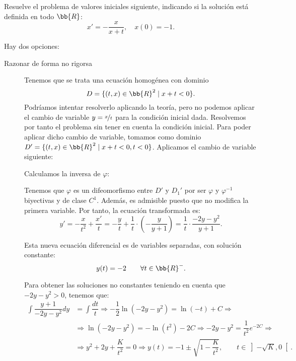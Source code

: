 \documentclass[12pt]{article}
\begin{document}
\begin{ejercicio}
    Resuelve el problema de valores iniciales siguiente, indicando si la solución está definida en todo $\bb{R}$:
    \begin{equation*}
        x'= -\frac{x}{x+t}, \quad x(0)=-1.
    \end{equation*}

    Hay dos opciones:
    \begin{description}
        \item[Razonar de forma no rigorsa]
        
        Tenemos que se trata una ecuación homogénea con dominio $$D=\{(t,x)\in\bb{R}^2\mid x+t<0\}.$$
        Podríamos intentar resolverlo aplicando la teoría, pero no podemos aplicar el cambio de variable $y=\nicefrac{x}{t}$ para la condición inicial dada.
        Resolvemos por tanto el problema sin tener en cuenta la condición inicial. Para poder aplicar dicho cambio de variable, tomamos como dominio
        $D'=\{(t,x)\in\bb{R}^2\mid x+t< 0,t<0\}$. Aplicamos el cambio de variable siguiente:

        Calculamos la inversa de $\varphi$:

        Tenemos que $\varphi$ es un difeomorfismo entre $D'$ y $D_1'$ por ser $\varphi$ y $\varphi^{-1}$ biyectivas y de clase $C^1$.
        Además, es admisible puesto que no modifica la primera variable. Por tanto, la ecuación transformada es:
        \begin{equation*}
            y'=-\dfrac{x}{t^2} + \dfrac{x'}{t}
            = -\dfrac{y}{t} + \dfrac{1}{t}\cdot \left(-\dfrac{y}{y+1}\right)
            = \dfrac{1}{t}\cdot \dfrac{-2y-y^2}{y+1}.
        \end{equation*}

        Esta nueva ecuación diferencial es de variables separadas, con solución constante:
        \begin{equation*}
            y(t)=-2\qquad \forall t\in \bb{R}^-.
        \end{equation*}

        Para obtener las soluciones no constantes teniendo en cuenta que $-2y-y^2>0$, tenemos que:
        \begin{align*}
            \int \dfrac{y+1}{-2y-y^2}dy &= \int \dfrac{dt}{t}
            \Longrightarrow -\dfrac{1}{2}\ln(-2y-y^2) = \ln(-t) + C
            \Longrightarrow \\&\Longrightarrow \ln(-2y-y^2) = -\ln(t^2)-2C
            \Longrightarrow -2y-y^2 = \dfrac{1}{t^2}e^{-2C}
            \Longrightarrow \\&\Longrightarrow y^2+2y+\dfrac{K}{t^2}=0
            \Longrightarrow y(t)=-1\pm\sqrt{1-\dfrac{K}{t^2}},\qquad t\in \left]-\sqrt{K},0\right[.
        \end{align*}


\end{description}
\end{ejercicio}
\end{document}
